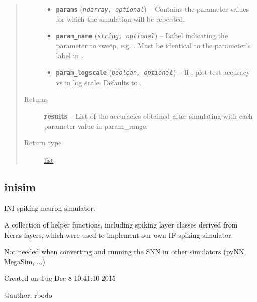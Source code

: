 \documentclass[letterpaper,10pt,english]{sphinxmanual}
\begin{document}
\begin{fulllineitems}
\begin{quote}
\begin{description}
\begin{itemize}
\item {} 
\textbf{\texttt{params}} (\emph{\texttt{ndarray, optional}}) -- Contains the parameter values for which the simulation will be
repeated.

\item {} 
\textbf{\texttt{param\_name}} (\emph{\texttt{string, optional}}) -- Label indicating the parameter to sweep, e.g. .
Must be identical to the parameter's label in .

\item {} 
\textbf{\texttt{param\_logscale}} (\emph{\texttt{boolean, optional}}) -- If , plot test accuracy vs  in log scale.
Defaults to .

\end{itemize}

\item[{Returns}] \leavevmode
\textbf{results} -- List of the accuracies obtained after simulating with each parameter
value in param\_range.

\item[{Return type}] \leavevmode
\href{https://docs.python.org/library/functions.html\#list}{list}

\end{description}\end{quote}

\end{fulllineitems}



\subsection{inisim}
\label{core:module-core.inisim}\label{core:inisim}
INI spiking neuron simulator.

A collection of helper functions, including spiking layer classes derived from
Keras layers, which were used to implement our own IF spiking simulator.

Not needed when converting and running the SNN in other simulators (pyNN,
MegaSim, ...)

Created on Tue Dec  8 10:41:10 2015

@author: rbodo
\end{document}
